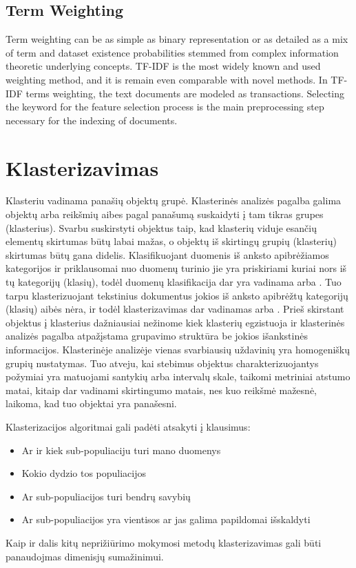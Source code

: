 \documentclass[draft]{VUMIFInfKursinis}
\begin{document}
\subsection{Term Weighting}
Term weighting can be as simple as binary representation or as detailed as a mix of term and dataset existence probabilities stemmed from complex information theoretic underlying concepts. TF-IDF is the most widely known and used weighting method, and it is remain even comparable with novel methods. In TF-IDF terms weighting, the text documents are modeled as transactions.  Selecting the keyword for the feature selection process is the main preprocessing step necessary for the indexing of documents.
\section{Klasterizavimas}

Klasteriu vadinama panašių objektų grupė. Klasterinės analizės pagalba galima objektų arba reikšmių aibes pagal panašumą suskaidyti į tam tikras grupes (klasterius). Svarbu suskirstyti objektus taip, kad klasterių viduje esančių elementų skirtumas būtų labai mažas, o objektų iš skirtingų grupių (klasterių) skirtumas būtų gana didelis. 
Klasifikuojant duomenis iš anksto apibrėžiamos kategorijos ir priklausomai nuo duomenų turinio jie yra priskiriami kuriai nors iš tų kategorijų (klasių), todėl duomenų klasifikacija dar yra vadinama  arba . Tuo tarpu klasterizuojant tekstinius dokumentus jokios iš anksto apibrėžtų kategorijų (klasių) aibės nėra, ir todėl klasterizavimas dar vadinamas  arba . Prieš skirstant objektus į klasterius dažniausiai nežinome kiek klasterių egzistuoja ir klasterinės analizės pagalba atpažįstama grupavimo struktūra be jokios išankstinės informacijos. 
Klasterinėje analizėje vienas svarbiausių uždavinių yra homogeniškų grupių nustatymas. Tuo atveju, kai stebimus objektus charakterizuojantys požymiai yra matuojami santykių arba intervalų skale, taikomi metriniai atstumo matai, kitaip dar vadinami skirtingumo matais, nes kuo reikšmė mažesnė, laikoma, kad tuo objektai yra panašesni.

Klasterizacijos algoritmai gali padėti atsakyti į klausimus:
\begin{itemize}
	\item Ar ir kiek sub-populiaciju turi mano duomenys
	\item Kokio dydzio tos populiacijos
	\item Ar sub-populiacijos turi bendrų savybių
	\item Ar sub-populiacijos yra vientisos ar jas galima papildomai išskaldyti
\end{itemize}
Kaip ir dalis kitų neprižiūrimo mokymosi metodų klasterizavimas gali būti panaudojmas dimenisjų sumažinimui. 
\end{document}
